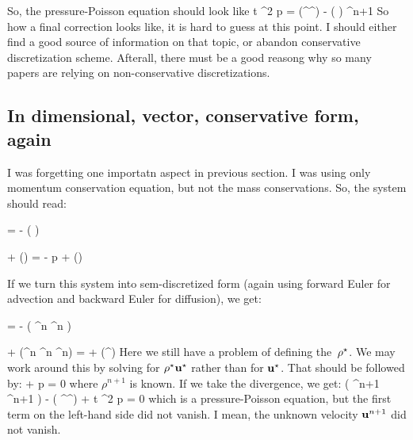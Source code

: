 \documentclass{report}
\begin{document}
So, the pressure-Poisson equation should look like
\be
  \Delta t \nabla^2 p 
  = 
  \nabla (\rho^\s \uvw^\s)
  -
  (  ) ^{n+1}
  \; \; \; \; [ \frac{kg}{m^3 s} ]
\ee
%
So how a final correction looks like, it is hard to guess at this point. 
I should either find a good source of information on that topic, or
abandon conservative discretization scheme. Afterall, there must be 
a good reasong why so many papers are relying on non-conservative
discretizations.

\subsection{In dimensional, vector, conservative form, again}

I was forgetting one importatn aspect in previous section. I was using
only momentum conservation equation, but not the mass conservations.
So, the system should read:

\be
   = - \nabla ( \rho \uvw )
  \; \; \; \; [ \frac{kg}{m^3 s} ]
\ee

\be
  + \nabla (\rho \uvw \uvw)
  =
  - \nabla p
  + \nabla \mu (\nabla \uvw)
  \; \; \; \; [ \frac{kg}{m^2 s^2} ]
\ee

If we turn this system into sem-discretized form (again using forward
Euler for advection and backward Euler for diffusion), we get:

\be
   = - \nabla ( \rho^n \uvw^n )
  \; \; \; \; [ \frac{kg}{m^3 s} ]
\ee

\be
  + \nabla (\rho^n \uvw^n \uvw^n)
  =
  + \nabla \mu (\nabla \uvw^\s)
  \; \; \; \; [ \frac{kg}{m^2 s^2} ]
\ee
%
Here we still have a problem of defining the~$\rho^\star$. We may work
around this by solving for $\rho^\star {\bf u}^\star$ rather than for ${\bf u}^\star$.
%
That should be followed by:
%
\be
  +
  \nabla p
  = 
  0
  \; \; \; \; [ \frac{kg}{m^2 s^2} ]
\ee
%
%
where $\rho^{n+1}$ is known. If we take the divergence, we get:
%
\be
  \nabla( \rho^{n+1} \uvw^{n+1} ) - \nabla ( \rho^\s \uvw^\s )
  +
  \Delta t \nabla^2 p
  = 
  0
  \; \; \; \; [ \frac{kg}{m^3 s} ]
\ee
%
which is a pressure-Poisson equation, but the first term on the 
left-hand side did not vanish. I mean, the unknown velocity ${\bf u}^{n+1}$
did not vanish. 
\end{document}
